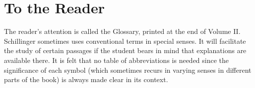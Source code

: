 
\chapter{To the Reader}

The reader's attention is called the Glossary, printed at the end of Volume II. Schillinger sometimes uses conventional terms in special senses. It will facilitate the study of certain passages if the student bears in mind that explanations are available there. It is felt that no table of abbreviations is needed since the significance of each symbol (which sometimes recurs in varying senses in different parts of the book) is always made clear in its context.
